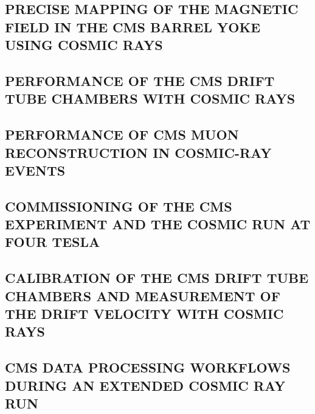 \documentclass[a4paper, 11pt, twoside, openright]{report}
\begin{document}
\subsection{PRECISE MAPPING OF THE MAGNETIC FIELD IN THE CMS BARREL YOKE USING COSMIC RAYS}


\subsection{PERFORMANCE OF THE CMS DRIFT TUBE CHAMBERS WITH COSMIC RAYS}


\subsection{PERFORMANCE OF CMS MUON RECONSTRUCTION IN COSMIC-RAY EVENTS}


\subsection{COMMISSIONING OF THE CMS EXPERIMENT AND THE COSMIC RUN AT FOUR TESLA}


\subsection{CALIBRATION OF THE CMS DRIFT TUBE CHAMBERS AND MEASUREMENT OF THE DRIFT VELOCITY WITH COSMIC RAYS}


\subsection{CMS DATA PROCESSING WORKFLOWS DURING AN EXTENDED COSMIC RAY RUN}

\end{document}
